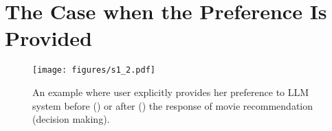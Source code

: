 \section{The Case when the Preference Is Provided}
\label{sec: knonw}


\begin{figure}[t]
\vskip -0.1in
\begin{center}
\centerline{\texttt{[image: figures/s1\_2.pdf]}}
\caption{
An example where user explicitly provides her preference to LLM system before () or after () the response of movie recommendation (decision making).}
\label{fig: s1}
\end{center}
\end{figure}





